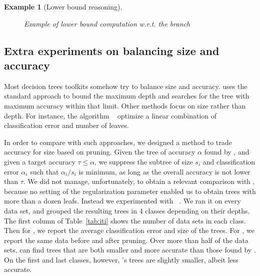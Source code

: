 \documentclass{article}
\newtheorem{example}{Example}
\begin{document}
\begin{example}[Lower bound reasoning]
\begin{figure}
\begin{center}
	\end{center}
	\caption{\label{fig:lowerbound} Example of lower bound computation w.r.t. the branch }
	\end{figure}

\end{example}


\subsection{Extra experiments on balancing size and accuracy}

Most decision trees toolkits somehow try to balance size and accuracy. \budalg uses the standard approach to bound the maximum depth and searches for the tree with maximum accuracy within that limit. Other methods focus on size rather than depth. 
For instance, the algorithm \gosdt~\cite{NEURIPS2019_ac52c626} optimize a linear combination of classification error and number of leaves. 

In order to compare with such approaches, we designed a method to trade accuracy for size based on pruning. Given the tree of accuracy $\alpha$ found by \budalg, and given a target accuracy $\tau \leq \alpha$, we suppress the subtree of size $s_i$ and classification error $\alpha_i$ such that $\alpha_i/s_i$ is minimum, as long as the overall accuracy is not lower than $\tau$.  We did not manage, unfortunately, to obtain a relevant comparison with \gosdt, because no setting of the regularization parameter enabled us to obtain trees with more than a dozen leafs. Instead we experimented with \iti~\cite{Utgoff97decisiontree}. We ran it on every data set, and grouped the resulting trees in 4 classes depending on their depths. The first column of Table~\ref{tab:iti} shows the number of data sets in each class. Then for \iti, we report the average classification error and size of the trees.
For \budalg, we report the same data before and after pruning. 
Over more than half of the data sets, \budalg can find trees that are both smaller and more accurate than those found by \iti. On the first and last classes, however, \iti's trees are slightly smaller, albeit less accurate.
\end{document}
